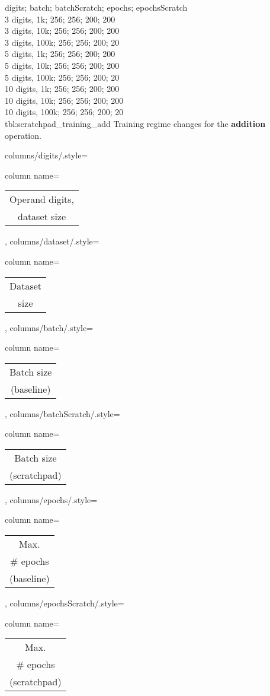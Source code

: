 {
	digits; batch; batchScratch; epochs; epochsScratch\\
	3 digits,  1k;  256; 256; 200; 200\\
	3 digits,  10k;  256; 256; 200; 200\\
	3 digits,  100k;  256; 256; 200; 20\\
	5 digits,  1k;  256; 256; 200; 200\\
	5 digits,  10k;  256; 256; 200; 200\\
	5 digits,  100k;  256; 256; 200; 20\\
	10 digits,  1k;  256; 256; 200; 200\\
	10 digits,  10k;  256; 256; 200; 200\\
	10 digits,  100k;  256; 256; 200; 20\\
}
{tbl:scratchpad_training_add}
{
	Training regime changes for the \textbf{addition} operation.
}
{%
	columns/digits/.style={column name={\begin{tabular}{c}
				Operand digits, \\
				dataset size
	\end{tabular}}},
	columns/dataset/.style={column name={\begin{tabular}{c}
				Dataset \\
				size
	\end{tabular}}},
	columns/batch/.style={column name={\begin{tabular}{c}
				Batch size \\
				(baseline)
	\end{tabular}}},
	columns/batchScratch/.style={column name={\begin{tabular}{c}
				Batch size \\
				(scratchpad)
	\end{tabular}}},
	columns/epochs/.style={column name={\begin{tabular}{c}
				Max. \\
				\# epochs \\
				(baseline)
	\end{tabular}}},
	columns/epochsScratch/.style={column name={\begin{tabular}{c}
				Max. \\
				\# epochs \\
				(scratchpad)
	\end{tabular}}}
}

